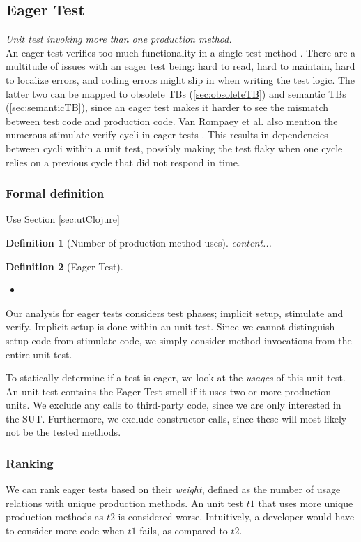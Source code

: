 \documentclass{uvamscse}
\newtheorem{definition}{Definition}[section]
\newcommand{\AsigTS}{Van Rompaey et al.}
\begin{document}
\subsection{Eager Test}
\label{sec:eager}
\emph{Unit test invoking more than one production method.}\\

An eager test verifies too much functionality in a single test method \cite{meszaros2007xunit}. There are a multitude of issues with an eager test being: hard to read, hard to maintain, hard to localize errors, and coding errors might slip in when writing the test logic. The latter two can be mapped to obsolete TBs (\ref{sec:obsoleteTB}) and semantic TBs (\ref{sec:semanticTB}), since an eager test makes it harder to see the mismatch between test code and production code. \AsigTS{} also mention the numerous stimulate-verify cycli in eager tests \cite{van2006characterizing}. This results in dependencies between cycli within a unit test, possibly making the test flaky when one cycle relies on a previous cycle that did not respond in time.

\subsubsection{Formal definition}
Use Section \ref{sec:utClojure}
\begin{definition}[Number of production method uses]
	content...
\end{definition}

\begin{definition}[Eager Test]
	\begin{itemize}
		\item 
	\end{itemize}
\end{definition}

Our analysis for eager tests considers test phases; implicit setup, stimulate and verify. Implicit setup is done within an unit test. Since we cannot distinguish setup code from stimulate code, we simply consider method invocations from the entire unit test. 

To statically determine if a test is eager, we look at the \emph{usages} of this unit test. An unit test contains the Eager Test smell if it uses two or more production units. We exclude any calls to third-party code, since we are only interested in the SUT. Furthermore, we exclude constructor calls, since these will most likely not be the tested methods.  

\subsubsection{Ranking}
We can rank eager tests based on their \emph{weight}, defined as the  number of usage relations with unique production methods. An unit test $t1$ that uses more unique production methods as $t2$ is considered worse. Intuitively, a developer would have to consider more code when $t1$ fails, as compared to $t2$.
\end{document}
